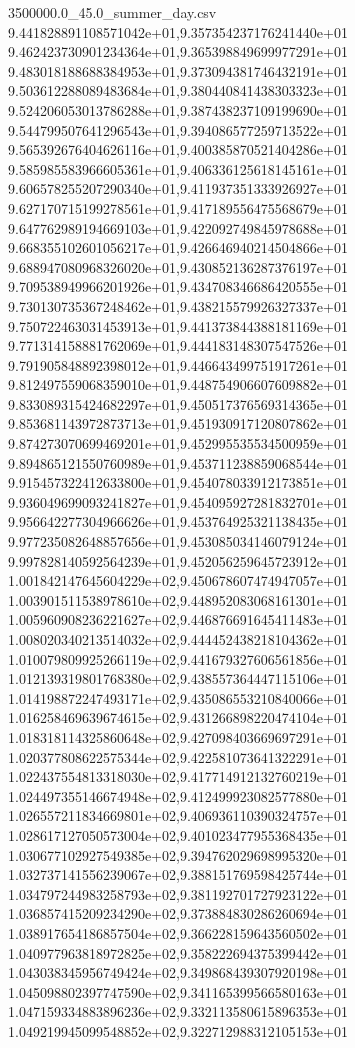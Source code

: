 \begin{filecontents*}{3500000.0_45.0_summer_day.csv}
9.441828891108571042e+01,9.357354237176241440e+01
9.462423730901234364e+01,9.365398849699977291e+01
9.483018188688384953e+01,9.373094381746432191e+01
9.503612288089483684e+01,9.380440841438303323e+01
9.524206053013786288e+01,9.387438237109199690e+01
9.544799507641296543e+01,9.394086577259713522e+01
9.565392676404626116e+01,9.400385870521404286e+01
9.585985583966605361e+01,9.406336125618145161e+01
9.606578255207290340e+01,9.411937351333926927e+01
9.627170715199278561e+01,9.417189556475568679e+01
9.647762989194669103e+01,9.422092749845978688e+01
9.668355102601056217e+01,9.426646940214504866e+01
9.688947080968326020e+01,9.430852136287376197e+01
9.709538949966201926e+01,9.434708346686420555e+01
9.730130735367248462e+01,9.438215579926327337e+01
9.750722463031453913e+01,9.441373844388181169e+01
9.771314158881762069e+01,9.444183148307547526e+01
9.791905848892398012e+01,9.446643499751917261e+01
9.812497559068359010e+01,9.448754906607609882e+01
9.833089315424682297e+01,9.450517376569314365e+01
9.853681143972873713e+01,9.451930917120807862e+01
9.874273070699469201e+01,9.452995535534500959e+01
9.894865121550760989e+01,9.453711238859068544e+01
9.915457322412633800e+01,9.454078033912173851e+01
9.936049699093241827e+01,9.454095927281832701e+01
9.956642277304966626e+01,9.453764925321138435e+01
9.977235082648857656e+01,9.453085034146079124e+01
9.997828140592564239e+01,9.452056259645723912e+01
1.001842147645604229e+02,9.450678607474947057e+01
1.003901511538978610e+02,9.448952083068161301e+01
1.005960908236221627e+02,9.446876691645411483e+01
1.008020340213514032e+02,9.444452438218104362e+01
1.010079809925266119e+02,9.441679327606561856e+01
1.012139319801768380e+02,9.438557364447115106e+01
1.014198872247493171e+02,9.435086553210840066e+01
1.016258469639674615e+02,9.431266898220474104e+01
1.018318114325860648e+02,9.427098403669697291e+01
1.020377808622575344e+02,9.422581073641322291e+01
1.022437554813318030e+02,9.417714912132760219e+01
1.024497355146674948e+02,9.412499923082577880e+01
1.026557211834669801e+02,9.406936110390324757e+01
1.028617127050573004e+02,9.401023477955368435e+01
1.030677102927549385e+02,9.394762029698995320e+01
1.032737141556239067e+02,9.388151769598425744e+01
1.034797244983258793e+02,9.381192701727923122e+01
1.036857415209234290e+02,9.373884830286260694e+01
1.038917654186857504e+02,9.366228159643560502e+01
1.040977963818972825e+02,9.358222694375399442e+01
1.043038345956749424e+02,9.349868439307920198e+01
1.045098802397747590e+02,9.341165399566580163e+01
1.047159334883896236e+02,9.332113580615896353e+01
1.049219945099548852e+02,9.322712988312105153e+01

\end{filecontents*}
